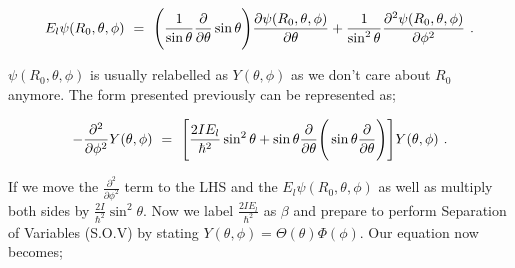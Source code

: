 \documentclass{article}
\begin{document}
\begin{equation} \label{eb-eq-256-49}
E_l \psi( R_0 , \theta, \phi ) \hspace{0.125cm} = \hspace{0.125cm} \Bigg( \frac{1}{\sin{\theta}} \frac{\partial}{\partial{\theta}}\sin{\theta}\Bigg) \frac{\partial{\psi( R_0 , \theta, \phi )}}{\partial{\theta}} + \frac{1}{\sin^{2}{\theta}} \frac{\partial^{2}{\psi( R_0 , \theta, \phi )}}{\partial{\phi}^{2}} \hspace{0.125cm}. 
\end{equation}

\begin{math} \psi( R_0 , \theta, \phi ) \end{math} is usually relabelled as \begin{math} Y(\theta, \phi ) \end{math} as we don't care about \begin{math} R_0 \end{math} anymore. The form presented previously can be represented as;

\begin{equation} \label{eb-eq-256-50}
-\frac{\partial^{2}}{\partial{\phi^{2}}} Y(\theta, \phi) \hspace{0.125cm} = \hspace{0.125cm} \Bigg[ \frac{2 I E_l}{\hbar^{2}} \sin^{2} \theta + \sin\theta\frac{\partial}{\partial{\theta}}\Bigg(\sin\theta \frac{\partial}{\partial{\theta}}\Bigg) \Bigg] Y(\theta, \phi) \hspace{0.125cm}. 
\end{equation}

If we move the \begin{math} \frac{\partial^{2}}{\partial{\phi}^{2}} \end{math} term to the LHS and the \begin{math} E_l \psi( R_0 , \theta, \phi ) \end{math} as well as multiply both sides by \begin{math} \frac{2 I}{\hbar^{2}} \sin^{2}\theta \end{math}. Now we label \begin{math} \frac{2 I E_l}{\hbar^{2}} \end{math} as \begin{math} \beta \end{math} and prepare to perform Separation of Variables (S.O.V) by stating \begin{math} Y(\theta,\phi) = \Theta(\theta) \Phi(\phi) \end{math}. Our equation now becomes;
\end{document}
